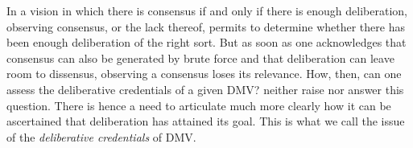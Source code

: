 \documentclass[version=3.21, pagesize, twoside=off, bibliography=totoc, DIV=calc, fontsize=12pt, a4paper, french, english]{scrartcl}
\begin{document}
In a vision in which there is consensus if and only if there is enough deliberation, observing consensus, or the lack thereof, permits to determine whether there has been enough deliberation of the right sort.
But as soon as one acknowledges that consensus can also be generated by brute force and that deliberation can leave room to dissensus, observing a consensus loses its relevance. 
How, then, can one assess the deliberative credentials of a given \ac{DMV}? 
\citeauthor{bartkowski_beyond_2018} neither raise nor answer this question.
There is hence a need to articulate much more clearly how it can be ascertained that deliberation has attained its goal. This is what we call the issue of the \emph{deliberative credentials} of \ac{DMV}.
\end{document}
